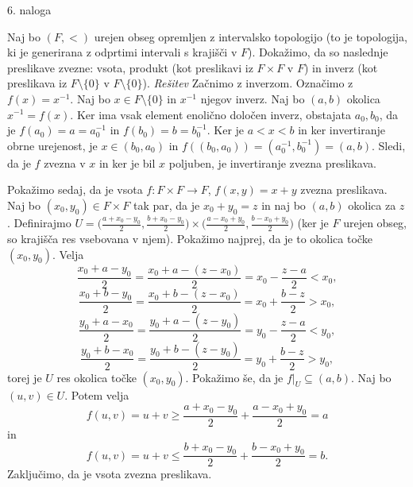 \documentclass[a4paper, 12pt]{article}
\begin{document}
\begin{flushleft}
6. naloga
\end{flushleft}
Naj bo $(F,<)$ urejen obseg opremljen z intervalsko topologijo (to je topologija, ki je generirana z odprtimi intervali s krajišči v $F$). Dokažimo, da so naslednje preslikave zvezne: vsota, produkt (kot preslikavi iz $F\times F$ v $F$) in inverz (kot preslikava iz $F \setminus \{0\}$ v $F\setminus \{0\}$).
\newline
\emph{Rešitev}
\newline
Začnimo z inverzom. Označimo z $f(x) = x^{-1}$. Naj bo $x\in F\setminus\{0\}$ in $x^{-1}$ njegov inverz. Naj bo $(a,b)$ okolica $x^{-1} = f(x)$. Ker ima vsak element enolično določen inverz, obstajata $a_0, b_0$, da je $f(a_0) = a = a_0^{-1}$ in $f(b_0) = b = b_0^{-1}$. Ker je $a< x <b$ in ker invertiranje obrne urejenost, je $x\in (b_0,a_0)$ in $f((b_0,a_0)) = (a_0^{-1}, b_0^{-1}) = (a,b)$. Sledi, da je $f$ zvezna v $x$ in ker je bil $x$ poljuben, je invertiranje zvezna preslikava.

Pokažimo sedaj, da je vsota $f:F\times  F \rightarrow F$, $f(x,y) = x+y$ zvezna preslikava. Naj bo $(x_0,y_0)\in F\times F$ tak par, da je $x_0 + y_0 = z$ in  naj bo $(a,b)$ okolica za $z$. Definirajmo $U = \big( \frac{a+x_0 - y_0}{2}, \frac{b+x_0 - y_0}{2}  \big) \times \big( \frac{a-x_0 + y_0}{2}, \frac{b-x_0 + y_0}{2} \big)$ (ker je $F$ urejen obseg, so krajišča res vsebovana v njem). Pokažimo najprej, da je to okolica točke $(x_0,y_0)$. Velja
$$
\frac{x_0 + a - y_0}{2} = \frac{x_0 + a -(z-x_0)}{2} = x_0 - \frac{z-a}{2} < x_0,
$$
$$
\frac{x_0 + b - y_0}{2} = \frac{x_0 + b -(z-x_0)}{2} = x_0 + \frac{b-z}{2} > x_0,
$$
$$
\frac{y_0 + a - x_0}{2} = \frac{y_0 + a -(z-y_0)}{2} = y_0 - \frac{z-a}{2} < y_0,
$$
$$
\frac{y_0 + b - x_0}{2} = \frac{y_0 + b -(z-y_0)}{2} = y_0 + \frac{b-z}{2} > y_0,
$$
torej je $U$ res okolica točke $(x_0,y_0)$. Pokažimo še, da je $f|_{U} \subseteq (a,b)$. Naj bo $(u,v) \in U$. Potem velja
$$
f(u,v)  = u + v \ge \frac{a+x_0-y_0}{2} + \frac{a-x_0+y_0}{2} = a
$$
in
$$
f(u,v)  = u + v \le \frac{b+x_0-y_0}{2} + \frac{b-x_0+y_0}{2} = b.
$$
Zaključimo, da je vsota zvezna preslikava.
\end{document}
